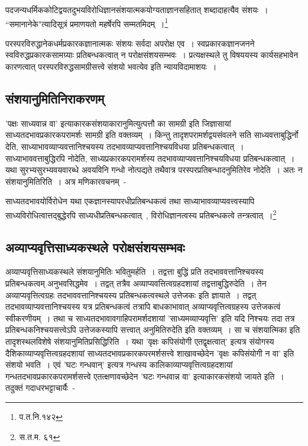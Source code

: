		{\fontsize{11.7}{0}\selectfont\s पदजन्यधर्मिककोटिद्वयतदुभयविरोधिज्ञानसंशयात्मकयोग्यताज्ञानसहितात् शब्दादाहत्यैव संशयः~। “समानानेके"त्यादिसूत्रं प्रमाणयतो महर्षेरपि सम्मतमिदम्~।\footnote{प.त.नि.१४२}}


	परस्परविरुद्धानेकधर्मप्रकारकज्ञानात्मकः संशयः सर्वदा अपरोक्ष एव~। स्वप्रकारकज्ञानजनने स्वविरुद्धप्रकारकसामग्र्याः प्रतिबन्धकत्वात् न परोक्षसंशयसम्भवः~। प्रत्यक्षस्थले तु विषययस्य कार्यसहभावेन कारणत्वात् परस्परविरुद्धसामग्रीसत्त्वे संशयो भवत्येव इति न्यायविदामाशयः~।

		\subsection{संशयानुमितिनिराकरणम्}

		'पक्षः साध्यवान्न वा' इत्याकारकसंशयाकारानुमित्युत्पत्तौ का सामग्री इति जिज्ञासायां साध्यतदभावप्रकारकपरामर्शः सामग्री इति वक्तव्यम्~। किन्तु तादृशपरामर्शद्वयसंवलने सति साध्यवत्ताबुद्धिर्नो देति, साध्याभावव्याप्यवत्तानिश्चयस्य तदभावव्याप्यवत्तानिश्चयविधया प्रतिबन्धकत्वात्~। साध्याभाववत्ताबुद्धिरपि नोदेति, साध्यप्रकारकपरामर्शस्य तदभावव्याप्यवत्तानिश्चयविधया प्रतिबन्धकत्वात्~। यथा सुरभ्यसुरभ्यवयवारब्धे अवयविनि गन्धो नोत्पद्यते तथैवात्र परस्परप्रतिबन्धादनुमितिरेव नोदेति~। अतः न संशयानुमितिरिति~। अत्र मणिकारवचनम्~-

		{\fontsize{11.7}{0}\selectfont\s साध्यतदभावयोर्विरोधेन यथा एकज्ञानस्यापरधीप्रतिबन्धकत्वं तथा साध्याभावव्याप्यवत्त्वस्यापि साध्यविरोधित्वात्तद्बुद्धेरपि साध्यधीप्रतिबन्धकत्वात्~, विरोधिज्ञानत्वस्य प्रतिबन्धकत्वे तन्त्रत्वात्~।\footnote{स.त.म. ६१}}

		\subsection{अव्याप्यवृत्तिसाध्यकस्थले परोक्षसंशयसम्भवः}

		अव्याप्यवृत्तिसाध्यकस्थले संशयानुमितिः भवितुमर्हति~। तद्वत्ता बुद्धिं प्रति तदभाववत्तानिश्चयस्य प्रतिबन्धकत्वम् अनुभवसिद्धमेव~। तद्वत् तत्रैव अव्याप्यवत्तित्वग्रहदशायां तद्वत्ताबुद्धिरुदेति~। तेन अव्याप्यवृत्तित्वग्रहः तदभाववत्तानिश्चयस्य प्रतिबन्धकत्वस्थले उत्तेजकः इति ज्ञायाते~। तद्वत् तदभावव्याप्यवत्तानिश्चयस्य यत्र प्रतिबन्धकत्वं तत्रापि बाधकाभावात् अव्याप्यवृत्तित्वग्रहस्य उत्तेजकत्वं स्वीकरणीयम्~। तथा च साध्यतदभावावगाहिपरामर्शदशायां 'साध्यमव्याप्यवृत्ति' इति यदि निश्चयः तदा तत्र प्रतिबन्धकनिश्चयसत्त्वेऽपि उत्तेजकस्यापि सत्त्वात् अनुमितिरुदेति इति वक्तव्यम्~। सा च संशयात्मिका इति तादृशस्थलविशेषे संशयानुमितिप्रसिद्धिरिति~। यथा 'वृक्षः कपिसंयोगी एतद्वृक्षत्वात्' इत्यत्र संयोगस्य दैशिकाव्याप्यवृत्तित्वग्रहदशायां साध्यतदभावप्रकारकपरमर्शसत्त्वे शाखावच्छेदेन 'वृक्षः कपिसंयोगी न वा' इति संशयो भवति~। एवं 'घटः गन्धवान्' इत्यत्र गन्धस्य कालिकाव्याप्यवृत्तित्वग्रहदशायां गन्धतदभावप्रकारकपरामर्शसत्त्वे एतत्क्षणावच्छेदेन 'घटः गन्धवान्न वा' इत्याकारकसंशयो जायते इति~। तदुक्तं गदाधरभट्टाचार्यैः~-

